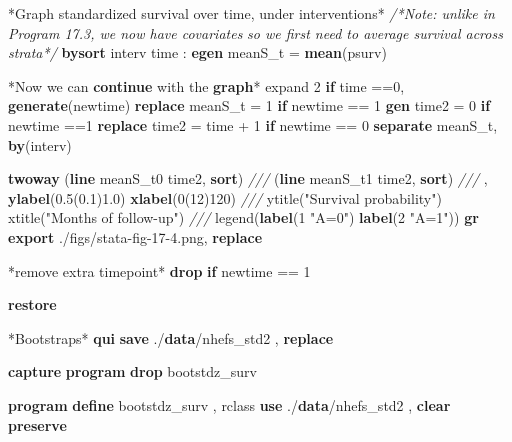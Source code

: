\documentclass[
  10pt,
]{book}
\newenvironment{Shaded}{\begin{snugshade}}{\end{snugshade}}
\newcommand{\BaseNTok}[1]{\textcolor[rgb]{0.00,0.00,0.81}{#1}}
\newcommand{\CommentTok}[1]{\textcolor[rgb]{0.56,0.35,0.01}{\textit{#1}}}
\newcommand{\KeywordTok}[1]{\textcolor[rgb]{0.13,0.29,0.53}{\textbf{#1}}}
\newcommand{\NormalTok}[1]{#1}
\newcommand{\StringTok}[1]{\textcolor[rgb]{0.31,0.60,0.02}{#1}}
\begin{document}
\begin{Shaded}
\begin{Highlighting}[]
\NormalTok{*Graph standardized survival }\BaseNTok{over}\NormalTok{ time, under interventions*}
\CommentTok{/*Note: unlike in Program 17.3, we now have covariates }
\CommentTok{so we first need to average survival across strata*/}
\KeywordTok{bysort}\NormalTok{ interv time : }\KeywordTok{egen}\NormalTok{ meanS_t = }\KeywordTok{mean}\NormalTok{(psurv)}

\NormalTok{*Now we can }\KeywordTok{continue}\NormalTok{ with the }\KeywordTok{graph}\NormalTok{*}
\NormalTok{expand 2 }\KeywordTok{if}\NormalTok{ time ==0, }\KeywordTok{generate}\NormalTok{(newtime)}
\KeywordTok{replace}\NormalTok{ meanS_t  = 1 }\KeywordTok{if}\NormalTok{ newtime == 1}
\KeywordTok{gen}\NormalTok{ time2 = 0 }\KeywordTok{if}\NormalTok{ newtime ==1}
\KeywordTok{replace}\NormalTok{ time2 = time + 1 }\KeywordTok{if}\NormalTok{ newtime == 0}
\KeywordTok{separate}\NormalTok{ meanS_t, }\KeywordTok{by}\NormalTok{(interv) }

\KeywordTok{twoway}\NormalTok{ (}\KeywordTok{line}\NormalTok{ meanS_t0 time2, }\KeywordTok{sort}\NormalTok{) }\CommentTok{///}
\NormalTok{  (}\KeywordTok{line}\NormalTok{ meanS_t1 time2, }\KeywordTok{sort}\NormalTok{) }\CommentTok{///}
\NormalTok{  , }\KeywordTok{ylabel}\NormalTok{(0.5(0.1)1.0) }\KeywordTok{xlabel}\NormalTok{(0(12)120) }\CommentTok{///}
  \BaseNTok{ytitle}\NormalTok{(}\StringTok{"Survival probability"}\NormalTok{) }\BaseNTok{xtitle}\NormalTok{(}\StringTok{"Months of follow-up"}\NormalTok{) }\CommentTok{///}
  \BaseNTok{legend}\NormalTok{(}\KeywordTok{label}\NormalTok{(1 }\StringTok{"A=0"}\NormalTok{) }\KeywordTok{label}\NormalTok{(2 }\StringTok{"A=1"}\NormalTok{))}
\KeywordTok{gr} \KeywordTok{export}\NormalTok{ ./figs/stata-fig-17-4.png, }\KeywordTok{replace}

\NormalTok{*remove extra timepoint*}
\KeywordTok{drop} \KeywordTok{if}\NormalTok{ newtime == 1}

\KeywordTok{restore}

\NormalTok{*Bootstraps*}
\KeywordTok{qui} \KeywordTok{save}\NormalTok{ ./}\KeywordTok{data}\NormalTok{/nhefs_std2 , }\KeywordTok{replace}
 
\KeywordTok{capture} \KeywordTok{program} \KeywordTok{drop}\NormalTok{ bootstdz_surv}

\KeywordTok{program} \KeywordTok{define}\NormalTok{ bootstdz_surv , rclass}
\KeywordTok{use}\NormalTok{ ./}\KeywordTok{data}\NormalTok{/nhefs_std2 , }\KeywordTok{clear}
\KeywordTok{preserve}


\end{Highlighting}
\end{Shaded}
\end{document}
